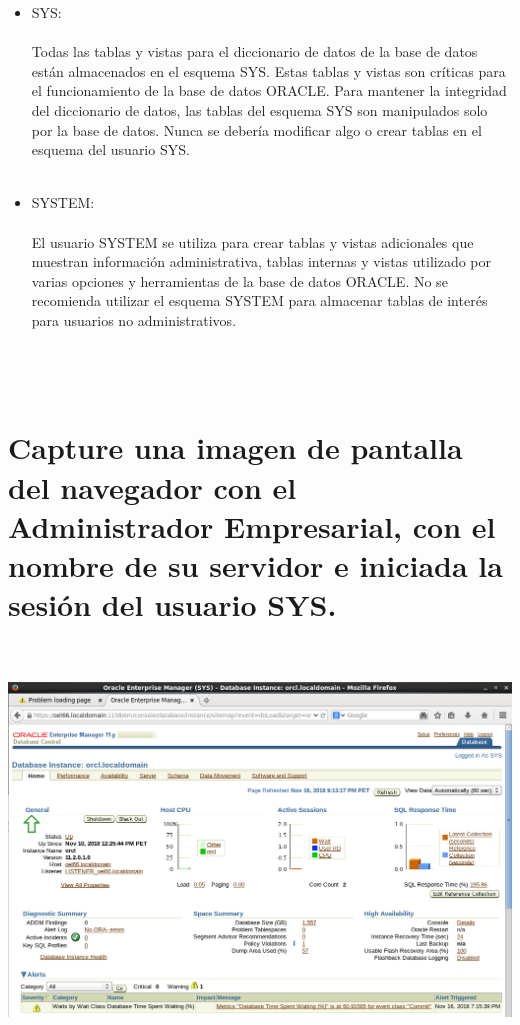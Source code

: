 \begin{itemize}
\item SYS:\\\\
Todas las tablas y vistas para el diccionario de datos de la base de datos están almacenados en el esquema SYS. Estas tablas y vistas son críticas para el funcionamiento de la base de datos ORACLE. Para mantener la integridad del diccionario de datos, las tablas del esquema SYS son manipulados solo por la base de datos. Nunca se debería modificar algo o crear tablas en el esquema del usuario SYS.\\\\

\item SYSTEM:\\\\
El usuario SYSTEM se utiliza para crear tablas y vistas adicionales que muestran información administrativa, tablas internas y vistas utilizado por varias opciones y herramientas de la base de datos ORACLE. No se recomienda utilizar el esquema SYSTEM para almacenar tablas de interés para usuarios no administrativos.\\\\

\\\
\end{itemize} 

\section{Capture una imagen de pantalla del navegador con el Administrador Empresarial, con el nombre de su servidor e iniciada la sesión del usuario SYS.}\\\\
\includegraphics[width=18cm]{./Imagenes/usuariosys}


